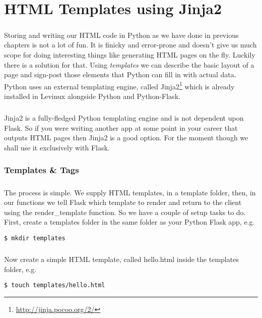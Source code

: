 \documentclass[12pt, a4paper, twoside]{book}
\begin{document}
\chapter{HTML Templates using Jinja2}
\label{style}
\paragraph{} Storing and writing our HTML code in Python as we have done in previous chapters is not a lot of fun. It is finicky and error-prone and doesn't give us much scope for doing interesting things like generating HTML pages on the fly. Luckily there is a solution for that. Using \emph{templates} we can describe the basic layout of a page and sign-post those elements that Python can fill in with actual data. Python uses an external templating engine, called Jinja2\footnote{\url{http://jinja.pocoo.org/2/}} which is already installed in Levinux alongside Python and Python-Flask.

\paragraph{} Jinja2 is a fully-fledged Python templating engine and is not dependent upon Flask. So if you were writing another app at some point in your career that outputs HTML pages then Jinja2 is a good option. For the moment though we shall use it exclusively with Flask.


\subsection{Templates \& Tags}
\label{templates-tags}
\paragraph{} The process is simple. We supply HTML templates, in a template folder, then, in our functions we tell Flask which template to render and return to the client using the render\_template function. So we have a couple of setup tasks to do. First, create a templates folder in the same folder as your Python Flask app, e.g.

\begin{lstlisting}[style=DOS]
$ mkdir templates
\end{lstlisting}

\paragraph{} Now create a simple HTML template, called hello.html inside the templates folder, e.g.
\begin{lstlisting}[style=DOS]
$ touch templates/hello.html
\end{lstlisting}
\end{document}
